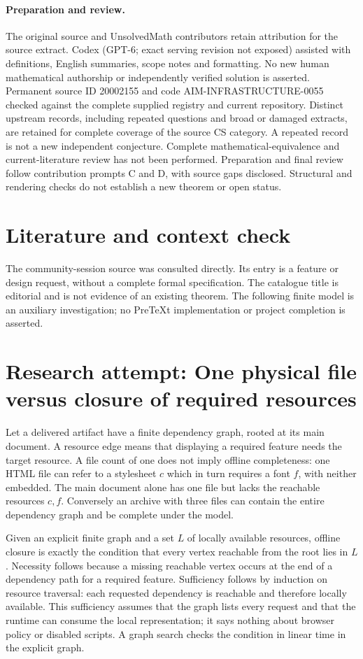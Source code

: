\documentclass[11pt]{article}
\begin{document}
\paragraph{Preparation and review.}
The original source and UnsolvedMath contributors retain attribution for the source extract. Codex (GPT-6; exact serving revision not exposed) assisted with definitions, English summaries, scope notes and formatting. No new human mathematical authorship or independently verified solution is asserted. Permanent source ID 20002155 and code AIM-INFRASTRUCTURE-0055 checked against the complete supplied registry and current repository. Distinct upstream records, including repeated questions and broad or damaged extracts, are retained for complete coverage of the source CS category. A repeated record is not a new independent conjecture. Complete mathematical-equivalence and current-literature review has not been performed. Preparation and final review follow contribution prompts C and D, with source gaps disclosed. Structural and rendering checks do not establish a new theorem or open status.
\label{end:20002155}

\section{Literature and context check}
The community-session source was consulted directly. Its entry is a feature or design request, without a complete formal specification. The catalogue title is editorial and is not evidence of an existing theorem. The following finite model is an auxiliary investigation; no PreTeXt implementation or project completion is asserted.
\section{Research attempt: One physical file versus closure of required resources}
Let a delivered artifact have a finite dependency graph, rooted at its main document. A resource edge means that displaying a required feature needs the target resource. A file count of one does not imply offline completeness: one HTML file can refer to a stylesheet $c$ which in turn requires a font $f$, with neither embedded. The main document alone has one file but lacks the reachable resources $c,f$. Conversely an archive with three files can contain the entire dependency graph and be complete under the model.

Given an explicit finite graph and a set $L$ of locally available resources, offline closure is exactly the condition that every vertex reachable from the root lies in $L$. Necessity follows because a missing reachable vertex occurs at the end of a dependency path for a required feature. Sufficiency follows by induction on resource traversal: each requested dependency is reachable and therefore locally available. This sufficiency assumes that the graph lists every request and that the runtime can consume the local representation; it says nothing about browser policy or disabled scripts. A graph search checks the condition in linear time in the explicit graph.
\end{document}
